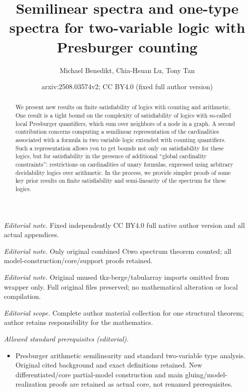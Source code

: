 \documentclass[10pt,a4paper]{article}
\title{Semilinear spectra and one-type spectra for two-variable logic with Presburger counting}
\author{Michael Benedikt, Chia-Hsuan Lu, Tony Tan}
\date{arxiv:2508.03574v2; CC BY4.0 (fixed full author version)}
\theoremstyle{definition}
\theoremstyle{remark}
\begin{document}
\maketitle
\noindent\textit{Editorial note.} Fixed independently CC BY4.0 full native author version and all actual appendices.\par\medskip
\noindent\textit{Editorial note.} Only original combined Ctwo spectrum theorem counted; all model-construction/core/support proofs retained.\par\medskip
\noindent\textit{Editorial note.} Original unused tkz-berge/tabularray imports omitted from wrapper only. Full original files preserved; no mathematical alteration or local compilation.\par\medskip
\noindent\textit{Editorial scope.} Complete author material collection for one structural theorem; author retains responsibility for the mathematics.\par\medskip
\noindent\textit{Allowed standard prerequisites (editorial).}\begin{itemize}
\item Presburger arithmetic semilinearity and standard two-variable type analysis. Original cited background and exact definitions retained. New differentiated/core partial-model construction and main gluing/model-realization proofs are retained as actual core, not renamed prerequisites.
\end{itemize}\medskip




\begin{abstract}
We present new results on finite satisfiability of logics with counting and arithmetic.
One result is a tight bound on the complexity of satisfiability of logics with so-called local Presburger quantifiers, which sum over neighbors of a node in a graph. A second contribution concerns computing a semilinear representation of the cardinalities associated with a formula in two variable logic extended with counting quantifiers. Such a representation allows you to get bounds not only on satisfiability for these logics, but for satisfiability in the presence of additional ``global cardinality constraints'': restrictions on cardinalities of unary formulas, expressed using arbitrary decidability logics over arithmetic.
In the process, we provide simpler proofs of some key prior  results on finite satisfiability and semi-linearity of the spectrum for these  logics.
\end{abstract}
\end{document}
